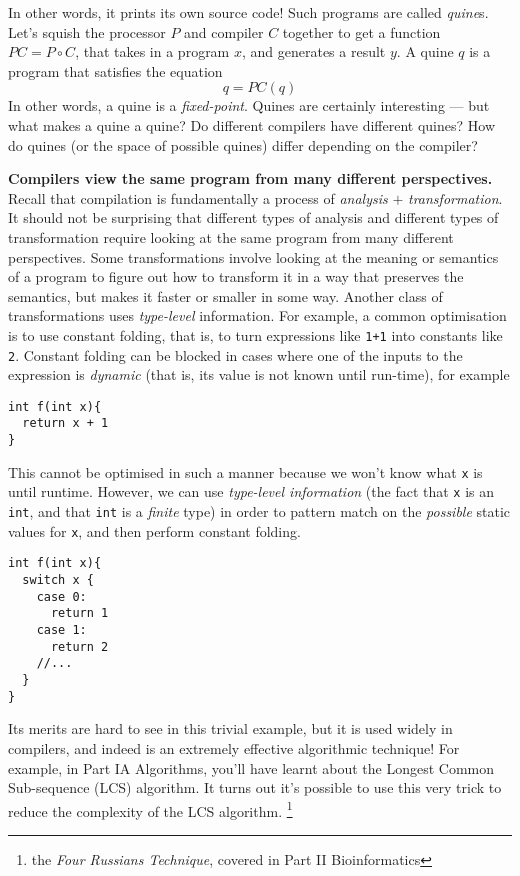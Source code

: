 In other words, it prints its own source code! Such programs are called \emph{quine}s. Let's squish the processor $P$ and compiler $C$ together to get a function $PC = P \circ C$, that takes in a program $x$, and generates a result $y$. A quine $q$ is a program that satisfies the equation
\[q = PC(q)\]
In other words, a quine is a \emph{fixed-point}. Quines are certainly interesting --- but what makes a quine a quine? Do different compilers have different quines? How do quines (or the space of possible quines) differ depending on the compiler?

\textbf{Compilers view the same program from many different perspectives.} Recall that compilation is fundamentally a process of \textit{analysis} $+$ \textit{transformation}. It should not be surprising that different types of analysis and different types of transformation require looking at the same program from many different perspectives. Some transformations involve looking at the meaning or semantics of a program to figure out how to transform it in a way that preserves the semantics, but makes it faster or smaller in some way. Another class of transformations uses \emph{type-level} information. For example, a common optimisation is to use constant folding, that is, to turn expressions like \texttt{1+1} into constants like \texttt{2}. Constant folding can be blocked in cases where one of the inputs to the expression is \emph{dynamic} (that is, its value is not known until run-time), for example

\begin{verbatim}
int f(int x){
  return x + 1
}
\end{verbatim}
This cannot be optimised in such a manner because we won't know what \texttt{x} is until runtime. However, we can use \emph{type-level information} (the fact that \texttt{x} is an \texttt{int}, and that \texttt{int} is a \emph{finite} type) in order to pattern match on the \emph{possible} static values for \texttt{x}, and then perform constant folding. 

\begin{verbatim}
int f(int x){
  switch x {
    case 0:
      return 1
    case 1:
      return 2
    //...
  }
}
\end{verbatim}
Its merits are hard to see in this trivial example, but it is used widely in compilers, and indeed is an extremely effective algorithmic technique! For example, in {\sffamily Part IA Algorithms}, you'll have learnt about the Longest Common Sub-sequence (LCS) algorithm. It turns out it's possible to use this very trick to reduce the complexity of the LCS algorithm. \footnote{the \emph{Four Russians Technique}, covered in {\sffamily Part II Bioinformatics}}

